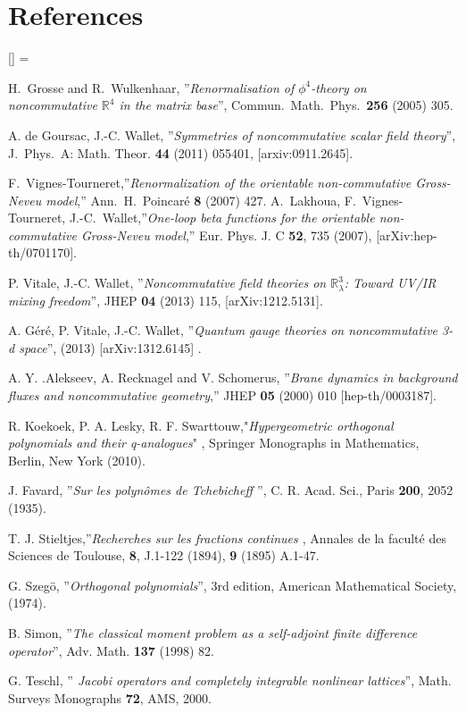\documentclass[a4paper]{jpconf}
\numberwithin{equation}{section}
\theoremstyle{nonumberplain}
\renewenvironment{thebibliography}[1]{%
\section*{References}%
\frenchspacing\small%
\begin{list}{[\arabic{enumi}]}%
{%
\usecounter{enumi}\parsep=2pt\topsep 0pt%
\settowidth{\labelwidth}{[#1]}%
\leftmargin=\labelwidth\advance\leftmargin\labelsep%
\rightmargin=0pt\itemsep=1pt\sloppy%
}%
}{\end{list}}
\begin{document}
\begin{thebibliography}{50}
H.~Grosse and R.~Wulkenhaar, ''{\it{Renormalisation of $\phi^4$-theory on noncommutative $\mathbb{R}^4$ in the matrix base}}'', 
Commun.\ Math.\ Phys.\  {\bf 256} (2005) 305.

 A. de Goursac, J.-C. Wallet, ''{\it{Symmetries of noncommutative scalar field theory}}'', J.\ Phys.\ A: Math. Theor. {\bf{44}} (2011) 055401, [arxiv:0911.2645]. 

F.~Vignes-Tourneret,''{\it{Renormalization of the orientable non-commutative Gross-Neveu model}},''  Ann.\ H.\ Poincar\'e {\bf{8}} (2007) 427. 
A.~Lakhoua, 
F.~Vignes-Tourneret, J.-C.~Wallet,''{\it{One-loop beta functions for the orientable non-commutative Gross-Neveu
 model}},'' Eur. Phys. J. C {\bf{52}}, 735 (2007), [arXiv:hep-th/0701170].

 P. Vitale, J.-C. Wallet, ''{\it{Noncommutative field theories on $\mathbb{R}^3_\lambda$: Toward UV/IR mixing freedom}}'', JHEP {\bf{04}} (2013) 115, [arXiv:1212.5131].

 A. G\'er\'e, P. Vitale, J.-C. Wallet, ''{\it{Quantum gauge theories on noncommutative 3-d space}}'', (2013) [arXiv:1312.6145] .

 A. Y. .Alekseev, A. Recknagel and V. Schomerus, ''{\it{Brane dynamics in background fluxes and
noncommutative geometry}},'' JHEP {\bf{05}} (2000) 010 [hep-th/0003187].

 R. Koekoek, P. A.  Lesky, R. F. Swarttouw,"{\it{Hypergeometric orthogonal polynomials and their q-analogues}}" , Springer Monographs in Mathematics, Berlin, New York (2010).

 J. Favard, ''{\it{Sur les polyn\^omes de Tchebicheff }}'', C. R. Acad. Sci., Paris {\bf{200}}, 2052 (1935).

 T. J. Stieltjes,''{\it{Recherches sur les fractions continues }}, Annales de la facult\'e des Sciences de Toulouse, {\bf{8}}, J.1-122 (1894), {\bf{9}} (1895) A.1-47.

 G. Szeg\"o, ''{\it{Orthogonal polynomials}}'', 3rd edition, American Mathematical Society, (1974).

 B. Simon, ''{\it{The classical moment problem as a self-adjoint finite difference operator}}'', Adv. Math. {\bf{137}} (1998) 82.

 G. Teschl, ''{\it{ Jacobi operators and completely integrable nonlinear lattices}}'', Math. Surveys Monographs {\bf{72}}, AMS, 2000.


\end{thebibliography}
\end{document}
